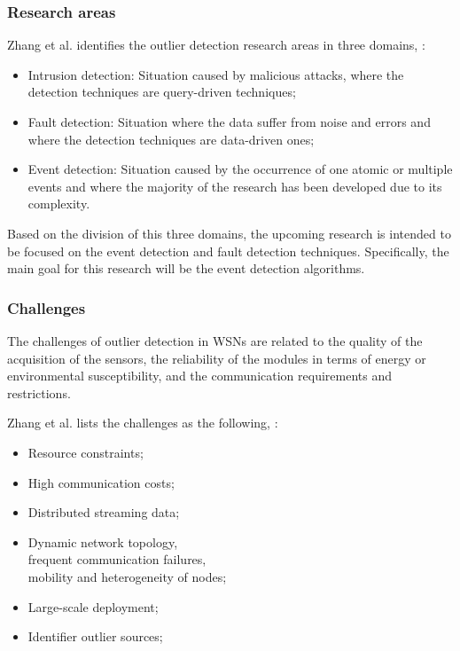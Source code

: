 \subsubsection{Research areas}
Zhang et al. identifies the outlier detection research areas in three domains, \cite{gen:zhang:2010} : 

\begin{itemize}
	\item Intrusion detection: Situation caused by malicious attacks, where the detection techniques are query-driven techniques;
	
	\item Fault detection: Situation where the data suffer from noise and errors and where the detection techniques are data-driven ones;
	
	\item Event detection: Situation caused by the occurrence of one atomic or multiple events and where the majority of the research has been developed due to its complexity.
\end{itemize}

Based on the division of this three domains, the upcoming research is intended to be focused on the event detection and fault detection techniques. Specifically, the main goal for this research will be the event detection algorithms.


\subsubsection{Challenges}

The challenges of outlier detection in WSNs are related to the quality of the acquisition of the sensors, the reliability of the modules in terms of energy or environmental susceptibility, and the communication requirements and restrictions.

Zhang et al. lists the challenges as the following,  \cite{gen:zhang:2010}:

\begin{itemize}
	\setlength\itemsep{-0.5em}
	
	\item Resource constraints;
	
	\item High communication costs;
	
	\item Distributed streaming data;
	
	\item Dynamic network topology, \\ frequent communication failures, \\ mobility and heterogeneity of nodes;
	
	\item Large-scale deployment;
	
	\item Identifier outlier sources;
	
\end{itemize}

